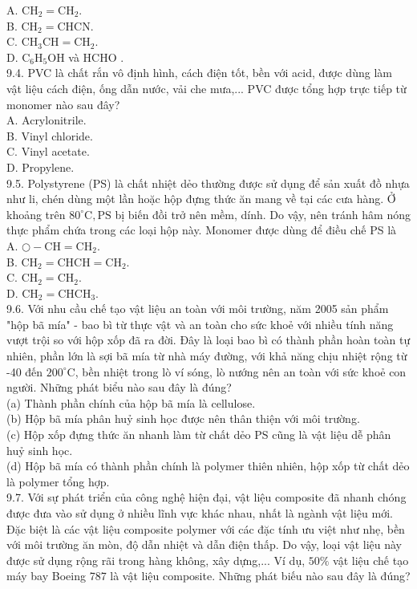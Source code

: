 \documentclass[10pt]{article}
\begin{document}
A. $\mathrm{CH}_{2}=\mathrm{CH}_{2}$.\\
B. $\mathrm{CH}_{2}=\mathrm{CHCN}$.\\
C. $\mathrm{CH}_{3} \mathrm{CH}=\mathrm{CH}_{2}$.\\
D. $\mathrm{C}_{6} \mathrm{H}_{5} \mathrm{OH}$ và HCHO .\\
9.4. PVC là chất rắn vô định hình, cách điện tốt, bền với acid, được dùng làm vật liệu cách điện, ống dẫn nước, vải che mưa,... PVC được tổng hợp trực tiếp từ monomer nào sau đây?\\
A. Acrylonitrile.\\
B. Vinyl chloride.\\
C. Vinyl acetate.\\
D. Propylene.\\
9.5. Polystyrene (PS) là chất nhiệt dẻo thường được sử dụng để sản xuất đồ nhựa như li, chén dùng một lần hoặc hộp đựng thức ăn mang về tại các cưa hàng. Ở khoảng trên $80^{\circ} \mathrm{C}, \mathrm{PS}$ bị biến đồi trở nên mềm, dính. Do vậy, nên tránh hâm nóng thực phẩm chứa trong các loại hộp này. Monomer được dùng để điều chế PS là\\
A. $\bigcirc-\mathrm{CH}=\mathrm{CH}_{2}$.\\
B. $\mathrm{CH}_{2}=\mathrm{CHCH}=\mathrm{CH}_{2}$.\\
C. $\mathrm{CH}_{2}=\mathrm{CH}_{2}$.\\
D. $\mathrm{CH}_{2}=\mathrm{CHCH}_{3}$.\\
9.6. Với nhu cầu chế tạo vật liệu an toàn với môi trường, năm 2005 sản phẩm "hộp bã mía" - bao bì từ thực vật và an toàn cho sức khoẻ với nhiều tính năng vượt trội so với hộp xốp đã ra đời. Đây là loại bao bì có thành phần hoàn toàn tự nhiên, phần lớn là sợi bã mía từ nhà máy đường, với khả năng chịu nhiệt rộng từ -40 đến $200^{\circ} \mathrm{C}$, bền nhiệt trong lò ví sóng, lò nướng nên an toàn với sức khoẻ con người. Những phát biểu nào sau đây là đúng?\\
(a) Thành phần chính của hộp bã mía là cellulose.\\
(b) Hộp bã mía phân huỷ sinh học được nên thân thiện với môi trường.\\
(c) Hộp xốp đựng thức ăn nhanh làm từ chất dẻo PS cũng là vật liệu dễ phân huỷ sinh học.\\
(d) Hộp bã mía có thành phần chính là polymer thiên nhiên, hộp xốp từ chất dẻo là polymer tổng hợp.\\
9.7. Với sự phát triển của công nghệ hiện đại, vật liệu composite đã nhanh chóng được đưa vào sử dụng ở nhiều lĩnh vực khác nhau, nhất là ngành vật liệu mới. Đặc biệt là các vật liệu composite polymer với các đặc tính ưu việt như nhẹ, bền với môi trường ăn mòn, độ dẫn nhiệt và dẫn điện thấp. Do vậy, loại vật liệu này được sử dụng rộng rãi trong hàng không, xây dựng,... Ví dụ, $50 \%$ vật liệu chế tạo máy bay Boeing 787 là vật liệu composite. Những phát biếu nào sau đây là đúng?\\
\end{document}
